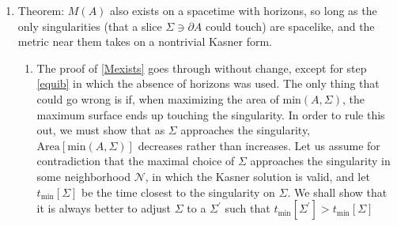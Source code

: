\documentclass{article}
\begin{document}
\begin{enumerate}[resume]
\item\label{Kas} Theorem: $M(A)$ also exists on a spacetime with horizons, so long as the only singularities (that a slice $\Sigma \ni \partial A$ could touch) are spacelike, and the metric near them takes on a nontrivial Kasner form. 

	\begin{enumerate}
	\item The proof of \ref{Mexists} goes through without change, except for step \ref{equib} in which the absence of horizons was used.  The only thing that could go wrong is if, when maximizing the area of $\mathrm{min}(A,\Sigma)$, the maximum surface ends up touching the singularity.  In order to rule this out, we must show that as $\Sigma$ approaches the singularity, $\mathrm{Area}[\mathrm{min}(A,\Sigma)]$ decreases rather than increases.  Let us assume for contradiction that the maximal choice of $\Sigma$ approaches the singularity in some neighborhood $\mathcal{N}$, in which the Kasner solution is valid, and let $t_\mathrm{min}[\Sigma]$ be the time closest to the singularity on $\Sigma$.  We shall show that it is always better to adjust $\Sigma$ to a $\Sigma^\prime$ such that $t_\mathrm{min}[\Sigma^\prime] > t_\mathrm{min}[\Sigma]$


\end{enumerate}
\end{enumerate}
\end{document}
